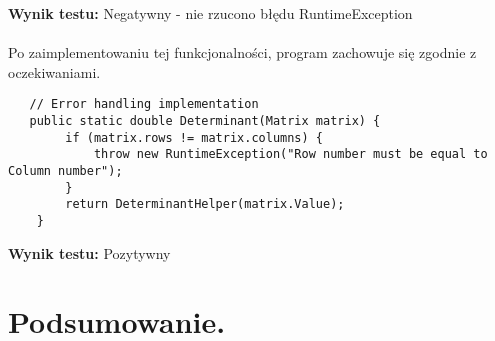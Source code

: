 \documentclass[a4paper,12pt,twoside]{article}
\begin{document}
\noindent
\textbf{Wynik testu: }{\color{red} Negatywny - nie rzucono błędu RuntimeException}\\\\
Po zaimplementowaniu tej funkcjonalności, program
zachowuje się zgodnie z oczekiwaniami.\\

\begin{lstlisting}
   // Error handling implementation
   public static double Determinant(Matrix matrix) {
        if (matrix.rows != matrix.columns) {
            throw new RuntimeException("Row number must be equal to Column number");
        }
        return DeterminantHelper(matrix.Value);
    }
\end{lstlisting}
\medskip

\noindent
\textbf{Wynik testu: }{\color{green} Pozytywny}


\section{Podsumowanie.}
\bigskip


\end{document}
